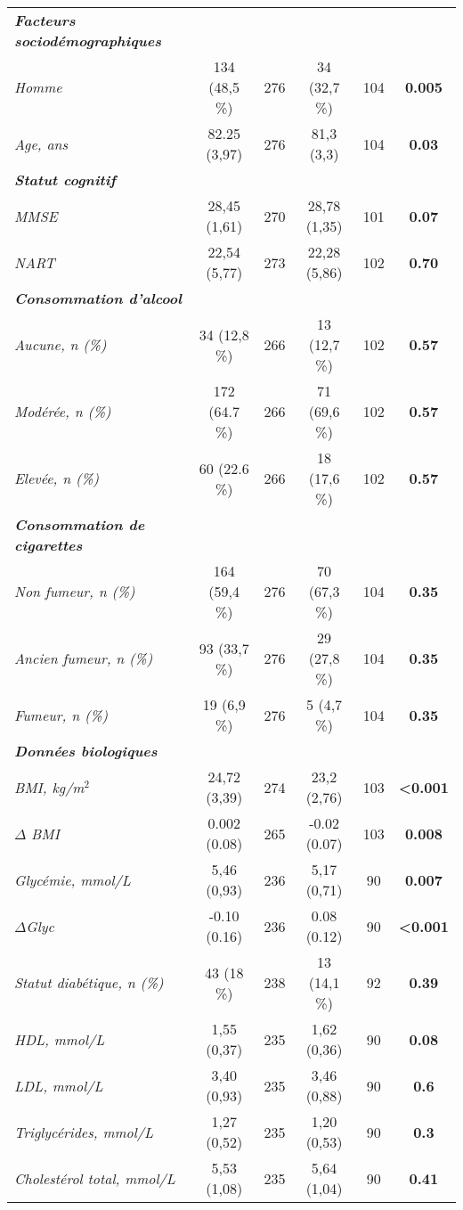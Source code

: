 \begin {table}
\begin{tabularx}{17cm}{X | c c c c c}
	\hline
	{\em \bf Facteurs sociodémographiques } &  & & & & \\
	{\em Homme} & 134 (48,5 \%) &276 & 34 (32,7 \%) & 104 & {\bf 0.005}\\
	{\em Age, ans} & 82.25 (3,97) &276 &81,3 (3,3) &104 &{\bf 0.03}\\
	\hline
	{\em \bf Statut cognitif } &  & & & & \\
	{\em MMSE} & 28,45 (1,61)& 270 &28,78 (1,35)& 101 &{\bf 0.07}\\
	{\em NART} & 22,54 (5,77) &273 &22,28 (5,86)& 102 &{\bf 0.70}\\
	\hline
	{\em \bf Consommation d’alcool } &  & & & & \\
	{\em Aucune, n (\%)} & 34 (12,8 \%) &266 &13 (12,7 \%)& 102 &{\bf 0.57}\\
	{\em Modérée, n (\%)} & 172 (64.7 \%) &266 &71 (69,6 \%) &102 &{\bf 0.57}\\
	{\em Elevée, n (\%)} & 60 (22.6 \%) &266 &18 (17,6 \%) &102 &{\bf 0.57}\\
	\hline
	{\em \bf Consommation de cigarettes } &  & & & & \\
	{\em Non fumeur, n (\%)} & 164 (59,4 \%) &276 &70 (67,3 \%)& 104 &{\bf 0.35}\\
	{\em Ancien fumeur, n (\%)} & 93 (33,7 \%) &276 &29 (27,8 \%)& 104 &{\bf 0.35}\\
	{\em Fumeur, n (\%)} & 19 (6,9 \%) &276 &5 (4,7 \%) &104 &{\bf 0.35}\\
	\hline
	{\em \bf Données biologiques} &  & & & & \\
	{\em BMI, kg/m$^2$} & 24,72 (3,39) &274 &23,2 (2,76) &103 &{\bf <0.001}\\
	{\em $\Delta$ BMI} & 0.002 (0.08)& 265 &-0.02 (0.07) &103 &{\bf 0.008}\\
	{\em Glycémie, mmol/L} & 5,46 (0,93) &236 &5,17 (0,71) &90& {\bf 0.007}\\
	{\em $\Delta$Glyc} & -0.10 (0.16) &236 &0.08 (0.12)& 90 &{\bf <0.001}\\
	{\em Statut diabétique, n (\%)} & 43 (18 \%) &238 &13 (14,1 \%)& 92& {\bf 0.39}\\
	{\em HDL, mmol/L} & 1,55 (0,37) &235 &1,62 (0,36) &90 &{\bf 0.08}\\
	{\em LDL, mmol/L} & 3,40 (0,93) &235 &3,46 (0,88) &90 &{\bf 0.6}\\
	{\em Triglycérides, mmol/L} & 1,27 (0,52) &235 &1,20 (0,53) &90 &{\bf 0.3}\\
	{\em Cholestérol total, mmol/L} & 5,53 (1,08) &235 &5,64 (1,04) &90 &{\bf 0.41}\\

\end{tabularx}
\end{table}
